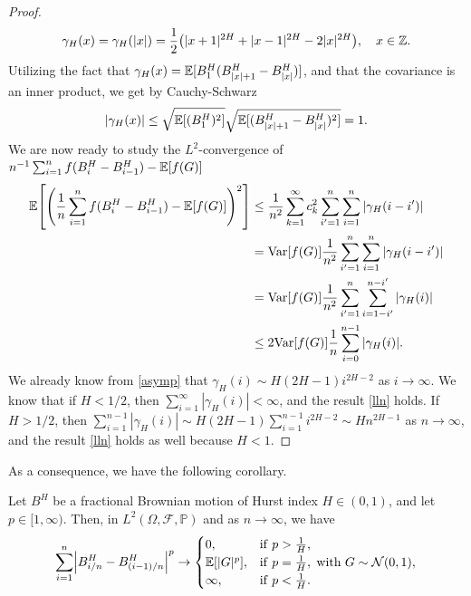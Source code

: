 \begin{proof}
\begin{equation}
    \gamma_{H}(x)=\gamma_{H}(|x|)=\frac{1}{2}\left(|x+1|^{2H}+|x-1|^{2H}-2|x|^{2H}\right), \quad x\in \Z. 
\end{equation}
Utilizing the fact that $\gamma_{H}(x)=\mathbb{E}[B_{1}^{H}(B_{|x|+1}^{H}-B_{|x|}^{H})]$, and that the covariance is an inner product, we get by Cauchy-Schwarz
\begin{align}
     |\gamma_{H}(x)|\leq \sqrt{\mathbb{E}[(B_{1}^{H})^{2}]}\sqrt{\mathbb{E}[(B_{|x|+1}^{H}-B_{|x|}^{H})^{2}]}=1.
\end{align}
We are now ready to study the $L^2$-convergence of $n^{-1}\sum_{i=1}^{n}f(B_{i}^{H}-B_{i-1}^{H})-\mathbb{E}[f(G)]$
\begin{align}
    \E\left[\left(\frac{1}{n}\sum_{i=1}^{n}f(B_{i}^{H}-B_{i-1}^{H})-\E[f(G)]\right)^{2}\right] &\leq \frac{1}{n^{2}}\sum_{k=1}^{\infty}c_{k}^{2}\sum_{i'=1}^{n}\sum_{i =1}^{n}|\gamma_{H}(i-i')|\\
    &= \mathrm{Var}[f(G)]\frac{1}{n^2}\sum_{i'=1}^{n}\sum_{i =1}^{n}|\gamma_{H}(i-i')|\\
    &= \mathrm{Var}[f(G)]\frac{1}{n^2}\sum_{i'=1}^{n}\sum_{i=1-i'}^{n-i'}|\gamma_{H}(i)|\\
    &\leq 2\mathrm{Var}[f(G)]\frac{1}{n}\sum_{i=0}^{n-1}|\gamma_{H}(i)|.
\end{align}
We already know from \eqref{asymp} that $\gamma_{H}(i)\sim H(2H-1)i^{2H-2}$ as $i\to \infty$. We know that if $H<1/2$, then $\sum_{i=1}^{\infty}|\gamma_{H}(i)|<\infty$, and the result \eqref{lln} holds. If $H>1/2$, then $\sum_{i=1}^{n-1}|\gamma_{H}(i)|\sim H(2H-1)\sum_{i=1}^{n-1}i^{2H-2}\sim Hn^{2H-1}$ as $n\to \infty$, and the result \eqref{lln} holds as well because $H<1$.
\end{proof}
As a consequence, we have the following corollary.
\begin{cor}\label{pvariations}
    Let $B^H$ be a fractional Brownian motion of Hurst index $H\in (0,1)$, and let $p\in [1,\infty)$. Then, in $L^{2}(\Omega,\mathcal{F},\mathbb{P})$ and as $n\to\infty$, we have
    \begin{equation}
        \sum_{i=1}^{n}\left|B_{i/n}^{H}-B_{(i-1)/n}^{H}\right|^{p}\to \begin{cases}
            0, & \mathrm{if} \hspace{3 pt}p>\frac{1}{H},\\
            \E[|G|^{p}], & \mathrm{if}\hspace{3 pt}p=\frac{1}{H},\hspace{3 pt} \mathrm{with}\hspace{3 pt} G\sim \mathcal{N}(0,1),\\
            \infty, & \mathrm{if}\hspace{3 pt}p<\frac{1}{H}.
        \end{cases}
    \end{equation}
\end{cor}
